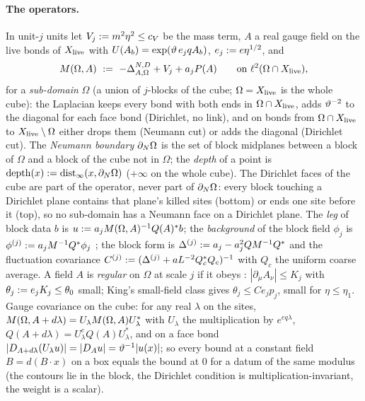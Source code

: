 \paragraph{The operators.} In unit-$j$ units let $V_j:= m^2\eta^2\le c_V$ be the mass term, $A$ a real gauge field on the live bonds of $X_{\mathrm{live}}$ with $U(A_b)=\exp(\vartheta\,e_jqA_b)$, $e_j:= e\eta^{1/2}$, and
\[
\Mop(\Omega,A)\ \defeq\ -\Delta^{N,D}_{A,\Omega}+V_j+a_jP(A)\qquad\text{on }\ell^2(\Omega\cap\Xl),
\]
for a \emph{sub-domain} $\Omega$ (a union of $j$-blocks of the cube; $\Omega=X_{\mathrm{live}}$ is the whole cube): the Laplacian keeps every bond with both ends in $\Omega\cap X_{\mathrm{live}}$, adds $\vartheta^{-2}$ to the diagonal for each face bond (Dirichlet, no link), and on bonds from $\Omega\cap X_{\mathrm{live}}$ to $X_{\mathrm{live}}\setminus\Omega$ either drops them (Neumann cut) or adds the diagonal (Dirichlet cut). The \emph{Neumann boundary} $\partial_{N}\Omega$ is the set of block midplanes between a block of $\Omega$ and a block of the cube not in $\Omega$; the \emph{depth} of a point is $\operatorname{depth}(x):=\operatorname{dist}_\infty(x,\partial_{N}\Omega)$ ($+\infty$ on the whole cube). The Dirichlet faces of the cube are part of the operator, never part of $\partial_{N}\Omega$: every block touching a Dirichlet plane contains that plane's killed sites (bottom) or ends one site before it (top), so no sub-domain has a Neumann face on a Dirichlet plane. The \emph{leg} of block data $b$ is $u:= a_jM(\Omega,A)^{-1}Q(A)^*b$; the \emph{background} of the block field $\phi_j$ is $\phi^{(j)}:= a_jM^{-1}Q^*\phi_j$ \cite[(2.14)--(2.16)]{K1}; the block form is $\Delta^{(j)}:= a_j-a_j^2QM^{-1}Q^*$ and the fluctuation covariance $C^{(j)}:=(\Delta^{(j)}+aL^{-2}Q_c^*Q_c)^{-1}$ with $Q_c$ the uniform coarse average. A field $A$ is \emph{regular} on $\Omega$ at scale $j$ if it obeys \cite[(3.5)]{K1}: $|\partial_\mu A_\nu|\le K_j$ with $\theta_j:= e_jK_j\le\theta_0$ small; King's small-field class gives $\theta_j\le Ce_jp_j$, small for $\eta\le\eta_1$. Gauge covariance on the cube: for any real $\lambda$ on the sites, $M(\Omega,A+d\lambda)=U_\lambda M(\Omega,A)U_\lambda^*$ with $U_\lambda$ the multiplication by $e^{eq\lambda}$, $Q(A+d\lambda)=U^c_\lambda Q(A)U_\lambda^*$, and on a face bond $|D_{A+d\lambda}(U_\lambda u)|=|D_Au|=\vartheta^{-1}|u(x)|$; so every bound at a constant field $B=d(B\cdot x)$ on a box equals the bound at $0$ for a datum of the same modulus (the contours lie in the block, the Dirichlet condition is multiplication-invariant, the weight is a scalar).

